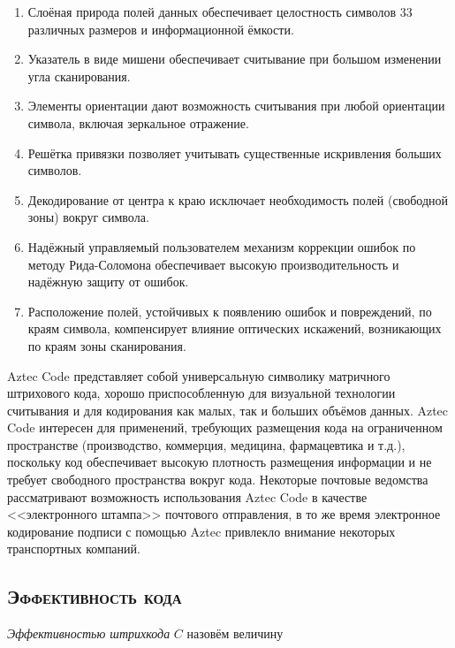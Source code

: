 \begin{enumerate}
\item Слоёная природа полей данных обеспечивает целостность символов 33 
различных размеров и информационной ёмкости.

\item Указатель в виде мишени обеспечивает считывание при большом изменении 
угла сканирования.

\item Элементы ориентации дают возможность считывания при любой ориентации 
символа, включая зеркальное отражение. 

\item Решётка привязки позволяет учитывать существенные искривления 
больших символов.

\item Декодирование от центра к краю исключает необходимость полей 
(свободной зоны) вокруг символа.

\item Надёжный управляемый пользователем механизм коррекции ошибок по 
методу Рида-Соломона обеспечивает высокую производительность и надёжную 
защиту от ошибок. 

\item Расположение полей, устойчивых к появлению ошибок и повреждений, 
по краям символа, компенсирует влияние оптических искажений, возникающих 
по краям зоны сканирования.

\end{enumerate}

Aztec Code представляет собой универсальную символику 
матричного штрихового кода, хорошо приспособленную для визуальной технологии 
считывания и для кодирования как малых, так и больших объёмов данных. 
Aztec Code интересен для применений, требующих размещения кода на ограниченном 
пространстве (производство, коммерция, медицина, фармацевтика и т.д.), 
поскольку код обеспечивает высокую плотность размещения информации и не 
требует свободного пространства вокруг кода. Некоторые почтовые ведомства 
рассматривают возможность использования Aztec Code в качестве <<электронного 
штампа>> почтового отправления, в то же время электронное кодирование подписи 
с помощью Aztec привлекло внимание некоторых транспортных компаний.

\subsection{\textsc{Эффективность кода}}

\textit{Эффективностью штрихкода} $C$ назовём величину 

